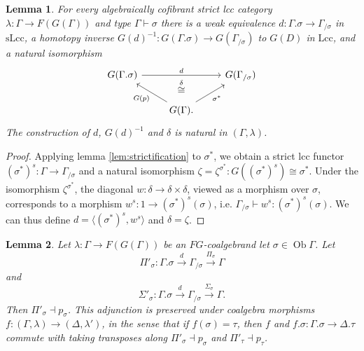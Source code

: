\documentclass{article}
\newtheorem{lemma}{Lemma}
\theoremstyle{remark}
\theoremstyle{definition}
\begin{document}
\begin{lemma}
  \label{lem:extension-to-slice}
  For every algebraically cofibrant strict lcc category $\lambda : \Gamma \rightarrow F(G(\Gamma))$ and type $\Gamma \vdash \sigma$ there is a weak equivalence $d : \Gamma.\sigma \rightarrow \Gamma_{/ \sigma}$ in $\mathrm{sLcc}$, a homotopy inverse $G(d)^{-1} : G(\Gamma.\sigma) \rightarrow G(\Gamma_{/ \sigma})$ to $G(D)$ in $\mathrm{Lcc}$, and a natural isomorphism
  \begin{equation}
    \begin{tikzcd}
      G(\Gamma.\sigma) \arrow[rr, "d"] & \, & G(\Gamma_{/ \sigma}) \\
      & G(\Gamma) \arrow[ul, "G(p)"] \arrow[ur, "\sigma^*"'] \arrow[u, phantom, near end, "\overset{\delta}{\cong}"].
    \end{tikzcd}
  \end{equation}
  The construction of $d$, $G(d)^{-1}$ and $\delta$ is natural in $(\Gamma, \lambda)$.
\end{lemma}
\begin{proof}
  Applying lemma \ref{lem:strictification} to $\sigma^*$, we obtain a strict lcc functor $(\sigma^*)^s : \Gamma \rightarrow \Gamma_{/ \sigma}$ and a natural isomorphism $\zeta = \zeta^{\sigma^*} : G((\sigma^*)^s) \cong \sigma^*$.
  Under the isomorphism $\zeta^{\sigma^*}$, the diagonal $w : \delta \rightarrow \delta \times \delta$, viewed as a morphism over $\sigma$, corresponds to a morphism $w^s : 1 \rightarrow (\sigma^*)^s(\sigma)$, i.e. $\Gamma_{/ \sigma} \vdash w^s : (\sigma^*)^s(\sigma)$.
  We can thus define $d = \langle (\sigma^*)^s, w^s \rangle$ and $\delta = \zeta$.
\end{proof}

\begin{lemma}
  Let $\lambda: \Gamma \rightarrow F(G(\Gamma))$ be an $FG$-coalgebrand let $\sigma \in \operatorname{Ob} \Gamma$.
  Let
  \begin{equation}
    \Pi'_\sigma : \Gamma.\sigma \xrightarrow{d} \Gamma_{/ \sigma} \xrightarrow{\Pi_\sigma} \Gamma
  \end{equation}
  and 
  \begin{equation}
    \Sigma'_\sigma : \Gamma.\sigma \xrightarrow{d} \Gamma_{/ \sigma} \xrightarrow{\Sigma_\sigma} \Gamma.
  \end{equation}
  Then $\Pi'_\sigma \dashv p_\sigma$.
  This adjunction is preserved under coalgebra morphisms $f : (\Gamma, \lambda) \rightarrow (\Delta, \lambda')$, in the sense that if $f(\sigma) = \tau$, then $f$ and $f.\sigma : \Gamma.\sigma \rightarrow \Delta.\tau$ commute with taking transposes along $\Pi'_\sigma \dashv p_\sigma$ and $\Pi'_\tau \dashv p_\tau$.
\end{lemma}
\end{document}
